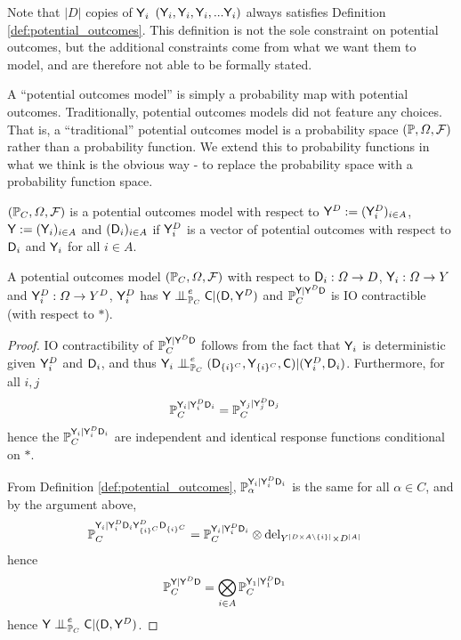 Note that $|D|$ copies of $\mathsf{Y}_i$ $(\mathsf{Y}_i,\mathsf{Y}_i,\mathsf{Y}_i,...\mathsf{Y}_i)$ always satisfies Definition \ref{def:potential_outcomes}. This definition is not the sole constraint on potential outcomes, but the additional constraints come from what we want them to model, and are therefore not able to be formally stated.

A ``potential outcomes model'' is simply a probability map with potential outcomes. Traditionally, potential outcomes models did not feature any choices. That is, a ``traditional'' potential outcomes model is a probability space $(\mathbb{P},\Omega,\mathcal{F})$ rather than a probability function. We extend this to probability functions in what we think is the obvious way - to replace the probability space with a probability function space.

\begin{definition}
$(\mathbb{P}_C,\Omega,\mathcal{F})$ is a potential outcomes model with respect to $\mathsf{Y}^D:=(\mathsf{Y}^D_i)_{i\in A}$, $\mathsf{Y}:=(\mathsf{Y}_i)_{i\in A}$ and $(\mathsf{D}_i)_{i\in A}$ if $\mathsf{Y}^D_i$ is a vector of potential outcomes with respect to $\mathsf{D}_i$ and $\mathsf{Y}_i$ for all $i\in A$.
\end{definition}

\begin{theorem}
A potential outcomes model $(\mathbb{P}_C,\Omega,\mathcal{F})$ with respect to $\mathsf{D}_i:\Omega\to D$, $\mathsf{Y}_i:\Omega\to Y$ and $\mathsf{Y}^D_i:\Omega\to Y^D$, $\mathsf{Y}^D_i$ has $\RV{Y}\CI_{\prob{P}_C}^e\RV{C}|(\RV{D},\RV{Y}^D)$ and $\mathbb{P}_C^{\mathsf{Y}|\mathsf{Y}^D\mathsf{D}}$ is IO contractible (with respect to $*$).
\end{theorem}

\begin{proof}
IO contractibility of $\mathbb{P}_C^{\mathsf{Y}|\mathsf{Y}^D\mathsf{D}}$ follows from the fact that $\mathsf{Y}_i$ is deterministic given $\mathsf{Y}^D_i$ and $\mathsf{D}_i$, and thus $\RV{Y}_i\CI^e_{\prob{P}_C} (\RV{D}_{\{i\}^C},\RV{Y}_{\{i\}^C},\RV{C})|(\RV{Y}^D_{i},\RV{D}_i)$. Furthermore, for all $i,j$
\begin{align}
    \mathbb{P}_C^{\mathsf{Y}_i|\mathsf{Y}^D_i\mathsf{D}_i} &= \mathbb{P}_C^{\mathsf{Y}_j|\mathsf{Y}^D_j\mathsf{D}_j}
\end{align}
hence the $\mathbb{P}_C^{\mathsf{Y}_i|\mathsf{Y}^D_i\mathsf{D}_i}$ are independent and identical response functions conditional on $*$.

From Definition \ref{def:potential_outcomes}, $\mathbb{P}_\alpha^{\mathsf{Y}_i|\mathsf{Y}^D_i\mathsf{D}_i}$ is the same for all $\alpha\in C$, and by the argument above,
\begin{align}
    \mathbb{P}_C^{\mathsf{Y}_i|\mathsf{Y}^D_i\mathsf{D}_i\mathsf{Y}^D_{\{i\}^C}\mathsf{D}_{\{i\}^C}} &= \mathbb{P}_C^{\mathsf{Y}_i|\mathsf{Y}^D_i\mathsf{D}_i}\otimes \mathrm{del}_{Y^{|D\times A\setminus\{i\}|}\times D^{|A|}}
\end{align}
hence
\begin{align}
    \mathbb{P}_C^{\mathsf{Y}|\mathsf{Y}^D\mathsf{D}} &= \bigotimes_{i\in A} \mathbb{P}_C^{\mathsf{Y}_1|\mathsf{Y}^D_1\mathsf{D}_1}
\end{align}
hence $\RV{Y}\CI_{\prob{P}_C}^e\RV{C}|(\RV{D},\RV{Y}^D)$.
\end{proof}

